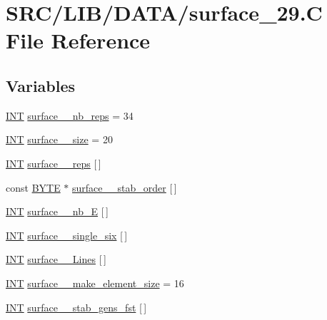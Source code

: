 \hypertarget{surface__29_8_c}{}\section{S\+R\+C/\+L\+I\+B/\+D\+A\+T\+A/surface\+\_\+29.C File Reference}
\label{surface__29_8_c}
\subsection*{Variables}
\begin{DoxyCompactItemize}
\item 
\mbox{\hyperlink{galois_8h_a09fddde158a3a20bd2dcadb609de11dc}{I\+NT}} \mbox{\hyperlink{surface__29_8_c_ac0ed0c76eb87b893990c37f55064de89}{surface\+\_\+\_\+nb\+\_\+reps}} = 34
\item 
\mbox{\hyperlink{galois_8h_a09fddde158a3a20bd2dcadb609de11dc}{I\+NT}} \mbox{\hyperlink{surface__29_8_c_aa58944a99db8d8a366be6638d9da11a8}{surface\+\_\+\_\+size}} = 20
\item 
\mbox{\hyperlink{galois_8h_a09fddde158a3a20bd2dcadb609de11dc}{I\+NT}} \mbox{\hyperlink{surface__29_8_c_a41cd06c2b27fc916096ae8c353c22ce1}{surface\+\_\+\_\+reps}} \mbox{[}$\,$\mbox{]}
\item 
const \mbox{\hyperlink{galois_8h_ab6cc7b4aeb6ea31aba2b3fbfc83ff5e6}{B\+Y\+TE}} $\ast$ \mbox{\hyperlink{surface__29_8_c_ac0c76438afe851ebc37d19edd39cd4e8}{surface\+\_\+\_\+stab\+\_\+order}} \mbox{[}$\,$\mbox{]}
\item 
\mbox{\hyperlink{galois_8h_a09fddde158a3a20bd2dcadb609de11dc}{I\+NT}} \mbox{\hyperlink{surface__29_8_c_a69f7d10fb80f21243514b167b3eb045d}{surface\+\_\+\_\+nb\+\_\+E}} \mbox{[}$\,$\mbox{]}
\item 
\mbox{\hyperlink{galois_8h_a09fddde158a3a20bd2dcadb609de11dc}{I\+NT}} \mbox{\hyperlink{surface__29_8_c_ad7a81fa27a85c1ea9274a18e3c0896e0}{surface\+\_\+\_\+single\+\_\+six}} \mbox{[}$\,$\mbox{]}
\item 
\mbox{\hyperlink{galois_8h_a09fddde158a3a20bd2dcadb609de11dc}{I\+NT}} \mbox{\hyperlink{surface__29_8_c_ab7a3e32f2da8ddd81a4679c15ab67f15}{surface\+\_\+\_\+\+Lines}} \mbox{[}$\,$\mbox{]}
\item 
\mbox{\hyperlink{galois_8h_a09fddde158a3a20bd2dcadb609de11dc}{I\+NT}} \mbox{\hyperlink{surface__29_8_c_ab3dbdd0934cc4e8b4bfd7d65fd8ae74f}{surface\+\_\+\_\+make\+\_\+element\+\_\+size}} = 16
\item 
\mbox{\hyperlink{galois_8h_a09fddde158a3a20bd2dcadb609de11dc}{I\+NT}} \mbox{\hyperlink{surface__29_8_c_a9746b707f099afd7f6e1b168707d2830}{surface\+\_\+\_\+stab\+\_\+gens\+\_\+fst}} \mbox{[}$\,$\mbox{]}

\end{DoxyCompactItemize}
